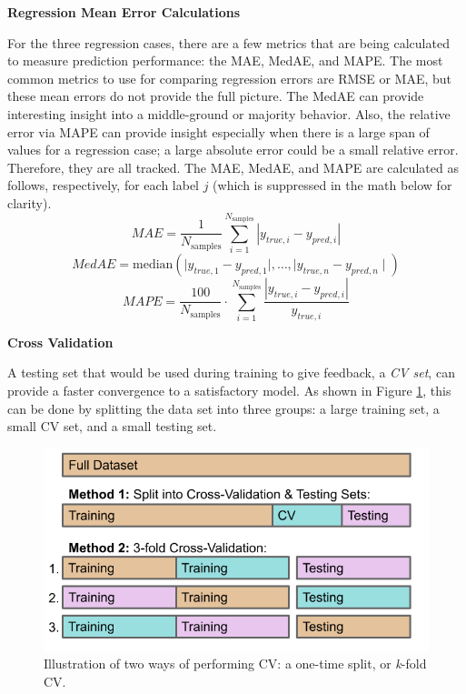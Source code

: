 \noindent \textbf{Regression Mean Error Calculations}

For the three regression cases, there are a few metrics that are being
calculated to measure prediction performance: the \gls{MAE}, \gls{MedAE}, and
\gls{MAPE}. The most common metrics to use for comparing regression errors are
\gls{RMSE} or \gls{MAE}, but these mean errors do not provide the full picture.
The \gls{MedAE} can provide interesting insight into a middle-ground or
majority behavior. Also, the relative error via \gls{MAPE} can provide insight
especially when there is a large span of values for a regression case; a large
absolute error could be a small relative error. Therefore, they are all
tracked.  The \gls{MAE}, \gls{MedAE}, and \gls{MAPE} are calculated as follows,
respectively, for each label $j$ (which is suppressed in the math below for
clarity).
\begin{equation}
  \textit{MAE} = \frac{1}{N_{\text{samples}}} \sum_{i=1}^{N_{\text{samples}}} 
                 \left| y_{true, i} - y_{pred, i} \right|
\end{equation}
\begin{equation}
  \textit{MedAE} = \text{median}(\mid y_{true, 1} - y_{pred, 1} \mid, \ldots, 
                                 \mid y_{true, n} - y_{pred, n} \mid)
\end{equation}
\begin{equation}
  \textit{MAPE} =  \frac{100}{N_{\text{samples}}} \cdot 
                   \sum_{i=1}^{N_{\text{samples}}}
                   \frac{\left| y_{true, i} - y_{pred, i} \right|}{y_{true, i}}
\end{equation}

\noindent \textbf{Cross Validation}

A testing set that would be used during training to give feedback, a
\textit{\gls{CV} set}, can provide a faster convergence to a satisfactory
model. As shown in Figure \ref{fig:cverror}, this can be done by splitting the
data set into three groups: a large training set, a small \gls{CV} set, and a
small testing set.  

\begin{figure}[!htb]
  \centering
  \includegraphics[width=0.85\linewidth]{./chapters/litrev/cverror.png}
  \caption[Illustration of cross validation]
          {Illustration of two ways of performing \gls{CV}: a one-time split, 
           or \textit{k}-fold \gls{CV}.}
  \label{fig:cverror}
\end{figure}

